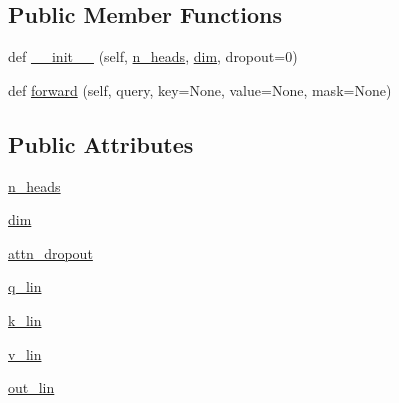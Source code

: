 \subsection*{Public Member Functions}
\begin{DoxyCompactItemize}
\item 
def \hyperlink{classparlai_1_1agents_1_1transformer_1_1modules_1_1MultiHeadAttention_a427b8cfaac6d37141555616d9cee8b74}{\+\_\+\+\_\+init\+\_\+\+\_\+} (self, \hyperlink{classparlai_1_1agents_1_1transformer_1_1modules_1_1MultiHeadAttention_aa28ff3887a718bb96a9bd27c938a0baf}{n\+\_\+heads}, \hyperlink{classparlai_1_1agents_1_1transformer_1_1modules_1_1MultiHeadAttention_a0ffd2e0d89db2f682561af438aaa1eb5}{dim}, dropout=0)
\item 
def \hyperlink{classparlai_1_1agents_1_1transformer_1_1modules_1_1MultiHeadAttention_a0685acda3d791bccfb9a6f4ff2c3680f}{forward} (self, query, key=None, value=None, mask=None)
\end{DoxyCompactItemize}
\subsection*{Public Attributes}
\begin{DoxyCompactItemize}
\item 
\hyperlink{classparlai_1_1agents_1_1transformer_1_1modules_1_1MultiHeadAttention_aa28ff3887a718bb96a9bd27c938a0baf}{n\+\_\+heads}
\item 
\hyperlink{classparlai_1_1agents_1_1transformer_1_1modules_1_1MultiHeadAttention_a0ffd2e0d89db2f682561af438aaa1eb5}{dim}
\item 
\hyperlink{classparlai_1_1agents_1_1transformer_1_1modules_1_1MultiHeadAttention_ac1c0169222b929c580d1a786479d7ed2}{attn\+\_\+dropout}
\item 
\hyperlink{classparlai_1_1agents_1_1transformer_1_1modules_1_1MultiHeadAttention_a84ab720bc232bb48e8f61e37e7c52323}{q\+\_\+lin}
\item 
\hyperlink{classparlai_1_1agents_1_1transformer_1_1modules_1_1MultiHeadAttention_a1e86cacd8fe8129222fe04c41c48655d}{k\+\_\+lin}
\item 
\hyperlink{classparlai_1_1agents_1_1transformer_1_1modules_1_1MultiHeadAttention_a1b1c33915c80f894221dfd4f0a0a2896}{v\+\_\+lin}
\item 
\hyperlink{classparlai_1_1agents_1_1transformer_1_1modules_1_1MultiHeadAttention_a495812bb583389a5f5dae989a22bda19}{out\+\_\+lin}
\end{DoxyCompactItemize}


